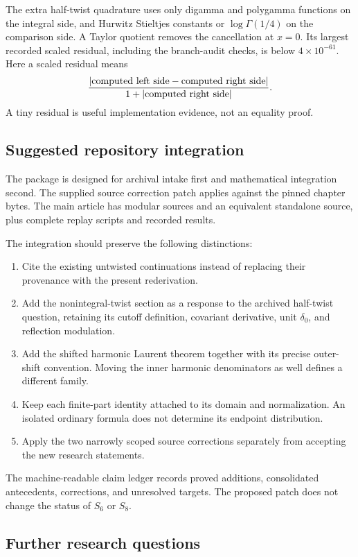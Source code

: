 \documentclass[11pt,letterpaper]{article}
\numberwithin{equation}{section}
\theoremstyle{plain}
\theoremstyle{definition}
\theoremstyle{remark}
\begin{document}
The extra half-twist quadrature uses only digamma and polygamma
functions on the integral side, and Hurwitz Stieltjes constants or
\(\log\Gamma(1/4)\) on the comparison side. A Taylor quotient removes
the cancellation at \(x=0\). Its largest recorded scaled residual,
including the branch-audit checks, is below \(4\times10^{-61}\).
Here a scaled residual means
\[
 \frac{|\hbox{computed left side}-\hbox{computed right side}|}
      {1+|\hbox{computed right side}|}.
\]
A tiny residual is useful implementation evidence, not an equality proof.

\subsection{Suggested repository integration}

The package is designed for archival intake first and mathematical
integration second. The supplied source correction patch applies
against the pinned chapter bytes. The main article has modular
sources and an equivalent standalone source, plus complete replay
scripts and recorded results.

The integration should preserve the following distinctions:
\begin{enumerate}[leftmargin=1.6em]
\item Cite the existing untwisted continuations instead of replacing
      their provenance with the present rederivation.
\item Add the nonintegral-twist section as a response to the archived
      half-twist question, retaining its cutoff definition, covariant
      derivative, unit \(\delta_0\), and reflection modulation.
\item Add the shifted harmonic Laurent theorem together with its
      precise outer-shift convention. Moving the inner harmonic
      denominators as well defines a different family.
\item Keep each finite-part identity attached to its domain and
      normalization. An isolated ordinary formula does not determine
      its endpoint distribution.
\item Apply the two narrowly scoped source corrections separately
      from accepting the new research statements.
\end{enumerate}
The machine-readable claim ledger records proved additions,
consolidated antecedents, corrections, and unresolved targets.
The proposed patch does not change the status of \(S_6\) or \(S_8\).

\subsection{Further research questions}
\end{document}
